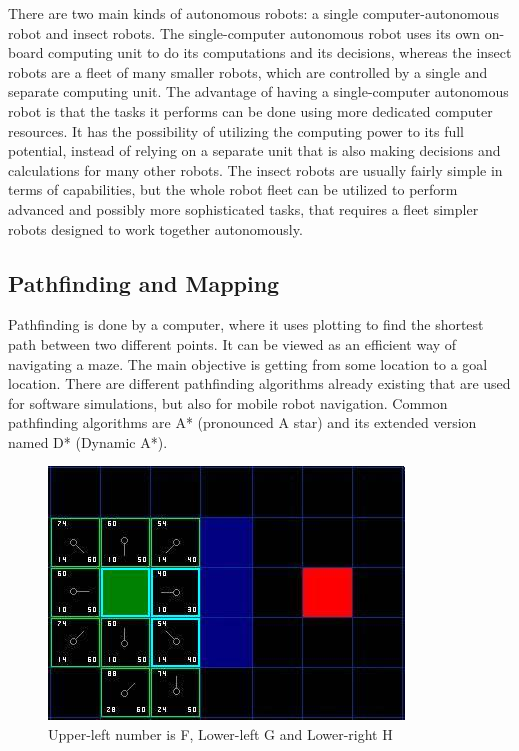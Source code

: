 There are two main kinds of autonomous robots: a single computer-autonomous robot and insect robots. The single-computer autonomous robot uses its own on-board computing unit to do its computations and its decisions, whereas the insect robots are a fleet of many smaller robots, which are controlled by a single and separate computing unit. The advantage of having a single-computer autonomous robot is that the tasks it performs can be done using more dedicated computer resources. It has the possibility of utilizing the computing power to its full potential, instead of relying on a separate unit that is also making decisions and calculations for many other robots. The insect robots are usually fairly simple in terms of capabilities, but the whole robot fleet can be utilized to perform advanced and possibly more sophisticated tasks, that requires a fleet simpler robots designed to work together autonomously\cite{singleandinsect}.

\subsection{Pathfinding and Mapping}

Pathfinding is done by a computer, where it uses plotting to find the shortest path between two different points. It can be viewed as an efficient way of navigating a maze. The main objective is getting from some location to a goal location.
There are different pathfinding algorithms already existing that are used for software simulations, but also for mobile robot navigation. Common pathfinding algorithms are A* (pronounced A star) and its extended version named D* (Dynamic A*).

\begin{figure}[H]
	\centering
	\includegraphics[width=.7\linewidth]{images/aStar2.jpg}
	\caption{Upper-left number is F, Lower-left G and Lower-right H\cite{astarfig}}
	\label{fig:sub2}
\end{figure}

